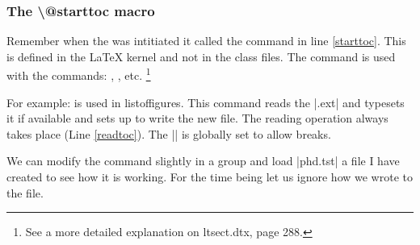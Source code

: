 %




\subsubsection{The \textbackslash @starttoc macro}

Remember when the \cmd{\tableofcontents} was intitiated it called the \cmd{\@starttoc} command in line \ref{starttoc}. This is defined in the LaTeX kernel and not in the class files. The  command is used with the commands:
, , etc. \footnote{See a more detailed explanation on ltsect.dtx, page 288.}

For example:  is used in listoffigures. This command
reads the |.ext| and typesets it if available and sets up to write the new file. The reading operation always takes place (Line \ref{readtoc}). The |\@nobreakfalse| is globally set to allow breaks. 

\begin{teX}
\def\@starttoc#1{%
\begingroup
  \makeatletter
  \@input{\jobname.#1}%
  \if@filesw
    \expandafter\newwrite\csname tf@#1\endcsname
    \immediate\openout \csname tf@#1\endcsname \jobname.#1\relax
   \fi
   \@nobreakfalse
\endgroup}
\end{teX}

We can modify the command slightly in a group and load |phd.tst| a file I have created to see how it is working. For the time being let us ignore how we wrote to the file.

